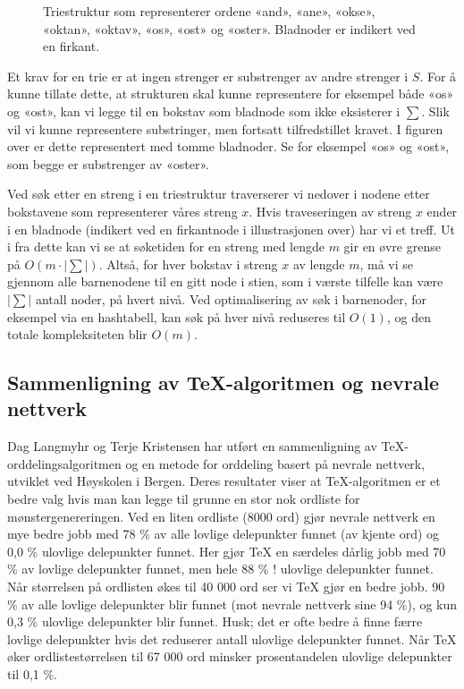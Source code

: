 \begin{SCfigure}[H]
\centering

\label{fig:trie}
\caption{Triestruktur som representerer ordene «and», «ane», «okse», «oktan», «oktav», «os», «ost» og «oster». Bladnoder er indikert ved en firkant.}
\end{SCfigure}

Et krav for en trie er at ingen strenger er substrenger av andre strenger i $S$. For å kunne tillate dette, at strukturen skal kunne representere for eksempel både «os» og «ost», kan vi legge til en bokstav som bladnode som ikke eksisterer i $\sum$. Slik vil vi kunne representere substringer, men fortsatt tilfredstillet kravet. I figuren over er dette representert med tomme bladnoder. Se for eksempel «os» og «ost», som begge er substrenger av «oster».

Ved søk etter en streng i en triestruktur traverserer vi nedover i nodene etter bokstavene som representerer våres streng $x$. Hvis traveseringen av streng $x$ ender i en bladnode (indikert ved en firkantnode i illustrasjonen over) har vi et treff. Ut i fra dette kan vi se at søketiden for en streng med lengde $m$ gir en øvre grense på $O(m\cdot |\sum|)$. Altså, for hver bokstav i streng $x$ av lengde $m$, må vi se gjennom alle barnenodene til en gitt node i stien, som i værste tilfelle kan være $|\sum|$ antall noder, på hvert nivå. Ved optimalisering av søk i barnenoder, for eksempel via en hashtabell, kan søk på hver nivå reduseres til $O(1)$, og den totale kompleksiteten blir $O(m)$. 

\subsection{Sammenligning av \TeX{}-algoritmen og nevrale nettverk}

Dag Langmyhr og Terje Kristensen \cite{kristensen1998two} har utført en sammenligning av \TeX{}-orddelingsalgoritmen og en metode for orddeling basert på nevrale nettverk, utviklet ved Høyskolen i Bergen. Deres resultater viser at \TeX{}-algoritmen er et bedre valg hvis man kan legge til grunne en stor nok ordliste for mønstergenereringen. Ved en liten ordliste (8000 ord) gjør nevrale nettverk en mye bedre jobb med 78 \% av alle lovlige delepunkter funnet (av kjente ord) og 0,0 \% ulovlige delepunkter funnet. Her gjør \TeX{} en særdeles dårlig jobb med 70 \% av lovlige delepunkter funnet, men hele 88 \% ! ulovlige delepunkter funnet. Når størrelsen på ordlisten økes til 40 000 ord ser vi \TeX{} gjør en bedre jobb. 90 \% av alle lovlige delepunkter blir funnet (mot nevrale nettverk sine 94 \%), og kun 0,3 \% ulovlige delepunkter blir funnet. Husk; det er ofte bedre å finne færre lovlige delepunkter hvis det reduserer antall ulovlige delepunkter funnet. Når \TeX{} øker ordlistestørrelsen til 67 000 ord minsker prosentandelen ulovlige delepunkter til 0,1 \%.

